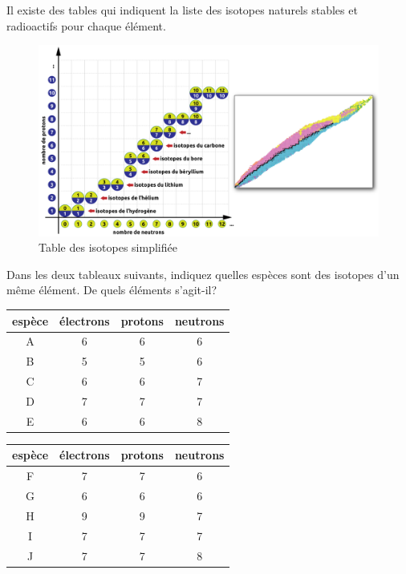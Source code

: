 \documentclass[
  11pt,
  a4paper,
  openany]{book}
\begin{document}
Il existe des tables qui indiquent la liste des isotopes naturels stables et radioactifs pour chaque élément.

\begin{figure}

{\centering \includegraphics[width=0.8\linewidth]{images/isotopes-table} 

}

\caption{Table des isotopes simplifiée}\label{fig:isotopes-table}
\end{figure}

\begin{Exercise}
Dans les deux tableaux suivants, indiquez quelles espèces sont des isotopes d'un même élément. De quels éléments s'agit-il?

\end{Exercise}

\begin{longtable}[]{@{}cccc@{}}
\toprule()
espèce & électrons & protons & neutrons \\
\midrule()
\endhead
A & 6 & 6 & 6 \\
B & 5 & 5 & 6 \\
C & 6 & 6 & 7 \\
D & 7 & 7 & 7 \\
E & 6 & 6 & 8 \\
\bottomrule()
\end{longtable}

\begin{longtable}[]{@{}cccc@{}}
\toprule()
espèce & électrons & protons & neutrons \\
\midrule()
\endhead
F & 7 & 7 & 6 \\
G & 6 & 6 & 6 \\
H & 9 & 9 & 7 \\
I & 7 & 7 & 7 \\
J & 7 & 7 & 8 \\
\bottomrule()
\end{longtable}
\end{document}
